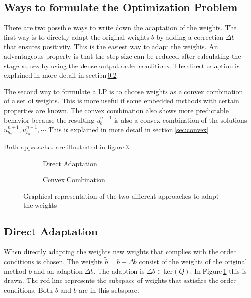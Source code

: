 \documentclass[a4paper]{scrartcl}
\numberwithin{equation}{section}
\theoremstyle{plain}
\theoremstyle{definition}
\numberwithin{theorem}{section}
\newcommand{\1}{\mathbbm{1}}
\begin{document}
\subsection{Ways to formulate the Optimization Problem}

There are two possible ways to write down the adaptation of the weights. The first way is to directly adapt the original weights $b$ by adding a correction $\Delta b$ that ensures positivity.
This is the easiest way to adapt the weights. An advantageous property is that the step size can be reduced after calculating the stage values by using the dense output order conditions.  
The direct adaption is explained in more detail in section\,\ref{sec:direct}.

The second way to formulate a LP is to choose weights as a convex combination of a set of weights. This is more useful if some embedded methods with certain properties are known. 
The convex combination also shows more predictable behavior because the resulting $u^{n+1}_b$ is also a convex combination of the solutions $u^{n+1}_{b_a},u^{n+1}_{b_b},\cdots$ 
This is explained in more detail in section\,\ref{sec:convex}

Both approaches are illustrated in figure\,\ref{fig:b_space}.


\begin{figure}
    \centering
    \begin{subfigure}[b]{0.45\textwidth}
        
        \caption{Direct Adaptation}
        \label{fig:b_direct}
    \end{subfigure}
    \begin{subfigure}[b]{0.45\textwidth}
        
        \caption{Convex Combination}
        \label{fig:b_convex}
    \end{subfigure}
    \caption{Graphical representation of the two different approaches to adapt the weights}\label{fig:b_space}
\end{figure}

\subsection{Direct Adaptation}\label{sec:direct}

When directly adapting the weights new weights that complies with the order conditions is chosen.   
The weights $\tilde{b} = b + \Delta b$ consist of the weights of the original method $b$ and an adaption $\Delta b$. The adaption is $\Delta b \in \mathrm{ker}(Q)$. 
In Figure\,\ref{fig:b_direct} this is drawn. The red line represents the subspace of weights that satisfies the order conditions. Both $b$ and $\tilde{b}$ are in this subspace. 
 
\end{document}

